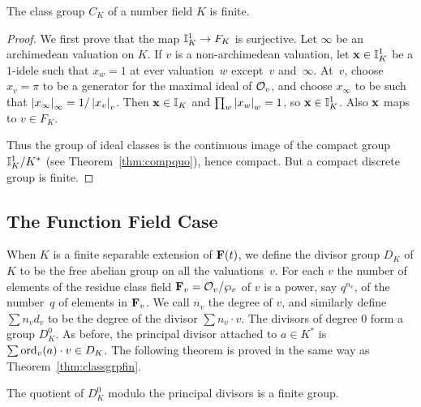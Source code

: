 \begin{theorem}\label{thm:classgrpfin}
The class group $C_K$ of a number field $K$ is finite.
\end{theorem}
\begin{proof}
  We first prove that the map $\mathbb{I}_K^1\to F_K$ is surjective.  Let
  $\infty$ be an archimedean valuation on $K$.  If $v$ is a
  non-archimedean valuation, let $\mathbf{x}\in \mathbb{I}_K^1$ be a $1$-idele such
  that $x_w=1$ at ever valuation~$w$ except~$v$ and~$\infty$.  At~$v$,
  choose $x_v = \pi$ to be a generator for the maximal ideal of
  $\mathcal{O}_v$, and choose $x_\infty$ to be such that $\left|x_\infty\right|_\infty
  = 1/\left|x_v\right|_v$.  Then $\mathbf{x}\in \mathbb{I}_K$ and $\prod_{w}\left|x_w\right|_w =
  1$, so $\mathbf{x}\in\mathbb{I}_K^1$.  Also $\mathbf{x}$ maps to $v \in F_K$.
  
  Thus the group of ideal classes is the continuous image of the
  compact group $\mathbb{I}_K^1/K^*$ (see Theorem~\ref{thm:compquo}), hence
  compact.  But a compact discrete group is finite.
\end{proof}

\subsection{The Function Field Case}

When $K$ is a finite separable extension of $\mathbf{F}(t)$, we define the
divisor group $D_K$ of $K$ to be the free abelian group on all the
valuations~$v$.  For each $v$ the number of elements of the residue class
field $\mathbf{F}_v = \mathcal{O}_v/\wp_v$ of $v$ is a power, say $q^{n_v}$, of the number~$q$
of elements in $\mathbf{F}_v$.  We call $n_v$ the degree of $v$, and similarly
define $\sum n_v d_v$ to be the degree of the divisor $\sum n_v\cdot v$.
The divisors of degree $0$ form a group $D_K^0$.  
As before, the principal divisor attached to $a\in K^*$  is 
$\sum \operatorname{ord}_v(a) \cdot v \in D_K$.
The following theorem is proved in the same way as Theorem~\ref{thm:classgrpfin}.
\begin{theorem}\label{thm:finclassgrpff}
The quotient of $D_K^0$ modulo the principal divisors is
a finite group.
\end{theorem}

